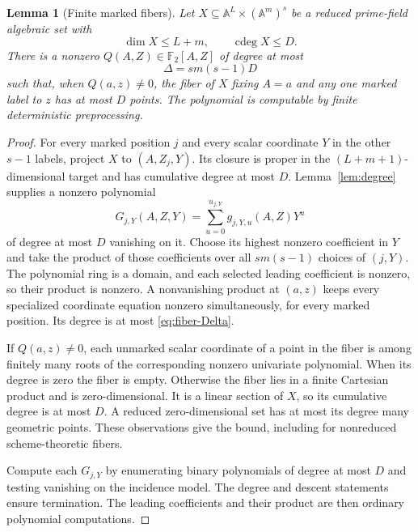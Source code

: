 \documentclass[11pt,a4paper]{article}
\newcommand{\F}{\mathbb F}
\newcommand{\A}{\mathbb A}
\DeclareMathOperator{\cdeg}{cdeg}
\newtheorem{lemma}[theorem]{Lemma}
\theoremstyle{definition}
\theoremstyle{remark}
\numberwithin{equation}{section}
\begin{document}
\begin{lemma}[Finite marked fibers]\label{lem:finite-fibers}
Let $X\subseteq\A^L\times(\A^m)^s$ be a reduced prime-field algebraic set with
\[
\dim X\le L+m,\qquad\cdeg X\le D.
\]
There is a nonzero $Q(A,Z)\in\F_2[A,Z]$ of degree at most
\begin{equation}\label{eq:fiber-Delta}
\Delta=s m(s-1)D
\end{equation}
such that, when $Q(a,z)\ne0$, the fiber of $X$ fixing $A=a$ and any one marked label to $z$ has at most $D$ points. The polynomial is computable by finite deterministic preprocessing.
\end{lemma}

\begin{proof}
For every marked position $j$ and every scalar coordinate $Y$ in the other $s-1$ labels, project $X$ to $(A,Z_j,Y)$. Its closure is proper in the $(L+m+1)$-dimensional target and has cumulative degree at most $D$. Lemma~\ref{lem:degree} supplies a nonzero polynomial
\[
G_{j,Y}(A,Z,Y)=\sum_{u=0}^{u_{j,Y}}g_{j,Y,u}(A,Z)Y^u
\]
of degree at most $D$ vanishing on it. Choose its highest nonzero coefficient in $Y$ and take the product of those coefficients over all $s m(s-1)$ choices of $(j,Y)$. The polynomial ring is a domain, and each selected leading coefficient is nonzero, so their product is nonzero. A nonvanishing product at $(a,z)$ keeps every specialized coordinate equation nonzero simultaneously, for every marked position. Its degree is at most \eqref{eq:fiber-Delta}.

If $Q(a,z)\ne0$, each unmarked scalar coordinate of a point in the fiber is among finitely many roots of the corresponding nonzero univariate polynomial. When its degree is zero the fiber is empty. Otherwise the fiber lies in a finite Cartesian product and is zero-dimensional. It is a linear section of $X$, so its cumulative degree is at most $D$. A reduced zero-dimensional set has at most its degree many geometric points. These observations give the bound, including for nonreduced scheme-theoretic fibers.

Compute each $G_{j,Y}$ by enumerating binary polynomials of degree at most $D$ and testing vanishing on the incidence model. The degree and descent statements ensure termination. The leading coefficients and their product are then ordinary polynomial computations.
\end{proof}
\end{document}
